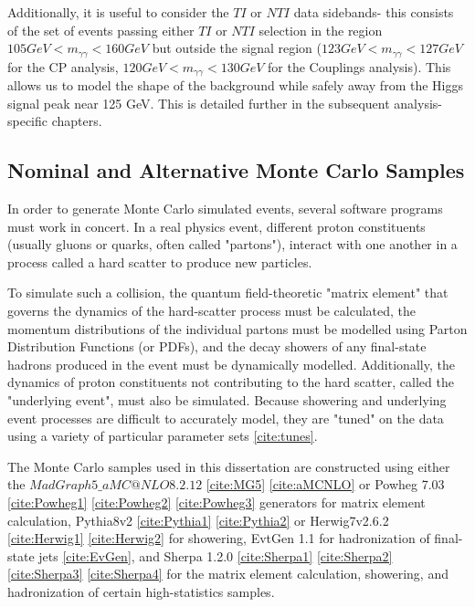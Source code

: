 Additionally, it is useful to consider the $TI$ or $NTI$ data sidebands- this consists of the set of events passing either $TI$ or $NTI$ selection in the region $105 GeV < m_{\gamma\gamma} < 160 GeV$ but outside the signal region ($123 GeV < m_{\gamma\gamma} < 127 GeV$ for the CP analysis, $120 GeV < m_{\gamma\gamma} < 130 GeV$ for the Couplings analysis). This allows us to model the shape of the background while safely away from the Higgs signal peak near 125 GeV. This is detailed further in the subsequent analysis-specific chapters.

\subsection{Nominal and Alternative Monte Carlo Samples} \label{sec:NominalMC} 

In order to generate Monte Carlo simulated events, several software programs must work in concert. In a real physics event, different proton constituents (usually gluons or quarks, often called "partons"), interact with one another in a process called a hard scatter to produce new particles. 

To simulate such a collision, the quantum field-theoretic "matrix element" that governs the dynamics of the hard-scatter process must be calculated, the momentum distributions of the individual partons must be modelled using Parton Distribution Functions (or PDFs), and the decay showers of any final-state hadrons produced in the event must be dynamically modelled. Additionally, the dynamics of proton constituents not contributing to the hard scatter, called the "underlying event", must also be simulated. Because showering and underlying event processes are difficult to accurately model, they are "tuned" on the data using a variety of particular parameter sets \ref{cite:tunes}. 

The Monte Carlo samples used in this dissertation are constructed using either the $MadGraph5\_aMC@NLO 8.2.12$ \ref{cite:MG5} \ref{cite:aMCNLO} or Powheg 7.03 \ref{cite:Powheg1} \ref{cite:Powheg2} \ref{cite:Powheg3} generators for matrix element calculation, Pythia8v2 \ref{cite:Pythia1} \ref{cite:Pythia2} or Herwig7v2.6.2 \ref{cite:Herwig1} \ref{cite:Herwig2} for showering, EvtGen 1.1 for hadronization of final-state jets \ref{cite:EvGen}, and Sherpa 1.2.0 \ref{cite:Sherpa1} \ref{cite:Sherpa2} \ref{cite:Sherpa3} \ref{cite:Sherpa4} for the matrix element calculation, showering, and hadronization of certain high-statistics samples.

